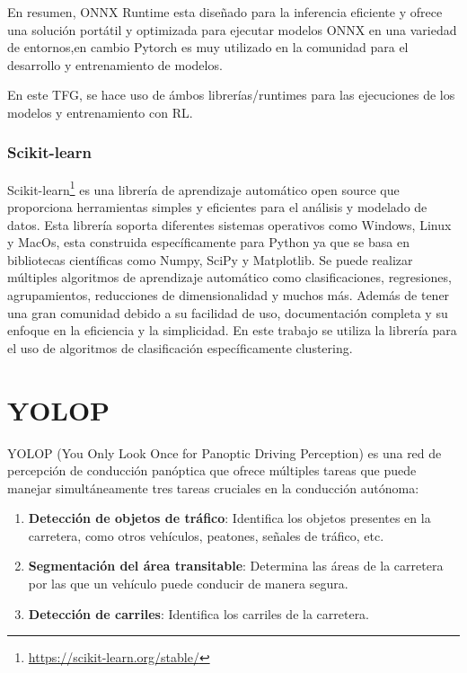 En resumen, ONNX Runtime esta diseñado para la inferencia eficiente y ofrece una solución portátil y optimizada para ejecutar modelos ONNX en una variedad de entornos,en cambio Pytorch es muy utilizado 
en la comunidad para el desarrollo y entrenamiento de modelos. 

En este TFG, se hace uso de ámbos librerías/runtimes para las ejecuciones de los modelos y entrenamiento con RL.

\subsubsection{Scikit-learn}
\label{Scikit-learn}

Scikit-learn\footnote{\url{https://scikit-learn.org/stable/}} es una librería de aprendizaje automático open source que proporciona herramientas simples y eficientes para el análisis 
y modelado de datos. Esta librería soporta diferentes sistemas operativos como Windows, Linux y MacOs, esta construida específicamente para Python ya que se basa en bibliotecas
científicas como Numpy, SciPy y Matplotlib. Se puede realizar múltiples algoritmos de aprendizaje automático como clasificaciones, regresiones, agrupamientos, reducciones de dimensionalidad y 
muchos más.
Además de tener una gran comunidad debido a su facilidad de uso, documentación completa y su enfoque en la eficiencia y la simplicidad. En este trabajo se utiliza la librería para el uso
de algoritmos de clasificación específicamente clustering. 

\section{YOLOP}
\label{sec:YOLOP}
YOLOP \cite{YOLOP} (You Only Look Once for Panoptic Driving Perception) es una red de percepción
de conducción panóptica que ofrece múltiples tareas que puede
manejar simultáneamente tres tareas cruciales en la conducción autónoma: 
\begin{enumerate}
  \item \textbf{Detección de objetos de tráfico}: Identifica los objetos presentes en la carretera, como otros vehículos, peatones, señales de tráfico, etc.
  \item \textbf{Segmentación del área transitable}: Determina las áreas de la carretera por las que un vehículo puede conducir de manera segura.
  \item \textbf{Detección de carriles}: Identifica los carriles de la carretera.
\end{enumerate}

